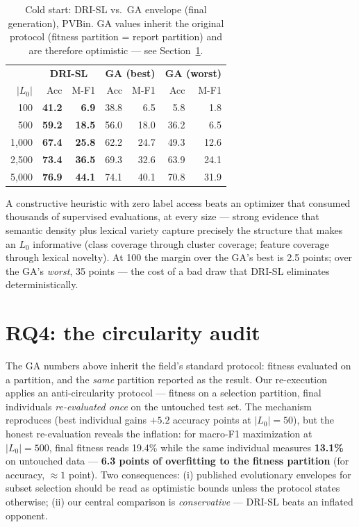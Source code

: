 \documentclass[11pt]{article}
\begin{document}
\begin{table}[htb]
\centering
\caption{Cold start: DRI-SL vs.\ GA envelope (final generation), PVBin.
GA values inherit the original protocol (fitness partition = report
partition) and are therefore optimistic --- see
Section~\ref{sec:audit}.}
\label{tab:drisl}
\small
\begin{tabular}{r rr rr rr}
\toprule
 & \multicolumn{2}{c}{\textbf{DRI-SL}} & \multicolumn{2}{c}{\textbf{GA (best)}}
 & \multicolumn{2}{c}{\textbf{GA (worst)}} \\
$|L_0|$ & Acc & M-F1 & Acc & M-F1 & Acc & M-F1 \\
\midrule
100    & \textbf{41.2} & \textbf{6.9}  & 38.8 & 6.5  & 5.8  & 1.8 \\
500    & \textbf{59.2} & \textbf{18.5} & 56.0 & 18.0 & 36.2 & 6.5 \\
1{,}000 & \textbf{67.4} & \textbf{25.8} & 62.2 & 24.7 & 49.3 & 12.6 \\
2{,}500 & \textbf{73.4} & \textbf{36.5} & 69.3 & 32.6 & 63.9 & 24.1 \\
5{,}000 & \textbf{76.9} & \textbf{44.1} & 74.1 & 40.1 & 70.8 & 31.9 \\
\bottomrule
\end{tabular}
\end{table}

A constructive heuristic with zero label access beats an optimizer that
consumed thousands of supervised evaluations, at every size --- strong
evidence that semantic density plus lexical variety capture precisely the
structure that makes an $L_0$ informative (class coverage through cluster
coverage; feature coverage through lexical novelty). At 100 the margin
over the GA's best is 2.5 points; over the GA's \emph{worst}, 35 points
--- the cost of a bad draw that DRI-SL eliminates deterministically.

\section{RQ4: the circularity audit}
\label{sec:audit}

The GA numbers above inherit the field's standard protocol: fitness
evaluated on a partition, and the \emph{same} partition reported as the
result. Our re-execution applies an anti-circularity protocol --- fitness
on a selection partition, final individuals \emph{re-evaluated once} on
the untouched test set. The mechanism reproduces (best individual gains
$+5.2$ accuracy points at $|L_0|=50$), but the honest re-evaluation
reveals the inflation: for macro-F1 maximization at $|L_0|=500$, final
fitness reads 19.4\% while the same individual measures \textbf{13.1\%}
on untouched data --- \textbf{6.3 points of overfitting to the fitness
partition} (for accuracy, $\approx 1$ point). Two consequences: (i)
published evolutionary envelopes for subset selection should be read as
optimistic bounds unless the protocol states otherwise; (ii) our central
comparison is \emph{conservative} --- DRI-SL beats an inflated opponent.
\end{document}
